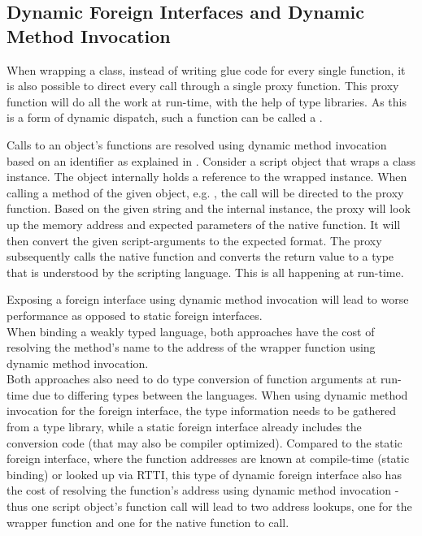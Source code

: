 
\subsection{Dynamic Foreign Interfaces and Dynamic Method Invocation}
\label{sec:DynamicForeignInterfaces}

When wrapping a class, instead of writing glue code for every single function, it is also possible to direct every call through a single proxy function. This proxy function will do all the work at run-time, with the help of type libraries. As this is a form of dynamic dispatch, such a function can be called a .

Calls to an object's functions are resolved using dynamic method invocation based on an identifier as explained in . Consider a script object that wraps a class instance. The object internally holds a reference to the wrapped instance. When calling a method of the given object, e.g. , the call will be directed to the proxy function. Based on the given string  and the internal instance, the proxy will look up the memory address and expected parameters of the native function. It will then convert the given script-arguments to the expected format. The proxy subsequently calls the native function and converts the return value to a type that is understood by the scripting language. This is all happening at run-time.

Exposing a foreign interface using dynamic method invocation will lead to worse performance as opposed to static foreign interfaces.\\
When binding a weakly typed language, both approaches have the cost of resolving the method's name to the address of the wrapper function using dynamic method invocation.\\
Both approaches also need to do type conversion of function arguments at run-time due to differing types between the languages. When using dynamic method invocation for the foreign interface, the type information needs to be gathered from a type library, while a static foreign interface already includes the conversion code (that may also be compiler optimized). Compared to the static foreign interface, where the function addresses are known at compile-time (static binding) or looked up via RTTI, this type of dynamic foreign interface also has the cost of resolving the function's address using dynamic method invocation - thus one script object's function call will lead to two address lookups, one for the wrapper function and one for the native function to call.


